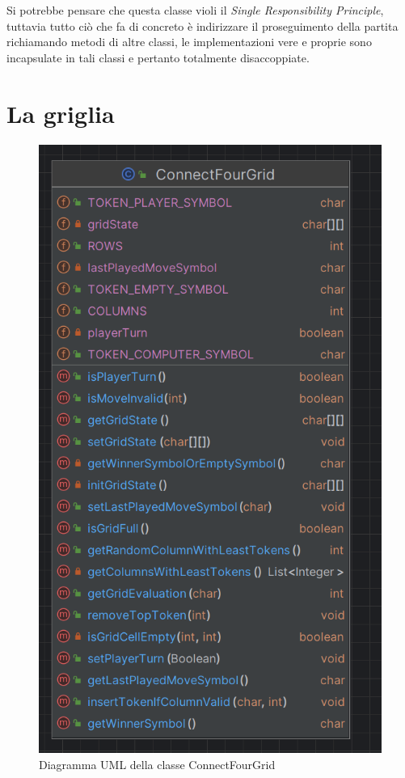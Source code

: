 Si potrebbe pensare che questa classe violi il \textit{Single Responsibility Principle}, tuttavia tutto ciò che fa di
concreto è indirizzare il proseguimento della partita richiamando metodi di altre classi, le implementazioni vere
e proprie sono incapsulate in tali classi e pertanto totalmente disaccoppiate.

\newpage
\section{La griglia}\label{sec:la-griglia}

\begin{figure}
    \centering
    \includegraphics[scale=0.4]{img/connectfourgrid-uml}
    \caption{Diagramma UML della classe ConnectFourGrid}
    \label{fig:connectfourgrid-uml}
\end{figure}

